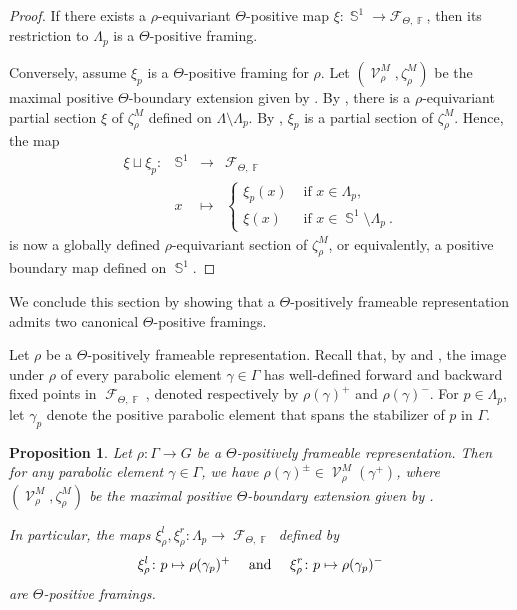\documentclass{amsart}
\theoremstyle{plain}
\newtheorem{proposition}{Proposition}[section]
\theoremstyle{definition}
\newcommand{\bdext}{{\Vc^M_\rho}}
\DeclareMathOperator{\Fc}{\mathcal{F}}
\DeclareMathOperator{\Vc}{\mathcal{V}}
\DeclareMathOperator{\Fb}{{\mathbb{F}}}
\DeclareMathOperator{\Sb}{\mathbb{S}}
\newcommand{\1}{\mathbf{1}}
\begin{document}
\begin{proof}
    If there exists a $\rho$-equivariant $\Theta$-positive map $\xi \colon \Sb^1 \to \mathcal F_{\Theta,\Fb}$, then its restriction to $\Lambda_p$ is a $\Theta$-positive framing.

    Conversely, assume $\xi_p$ is a $\Theta$-positive framing for $\rho$.
    Let $(\bdext,\zeta^M_\rho)$ be the maximal positive $\Theta$-boundary extension given by . By , there is a $\rho$-equivariant partial section $\xi$ of $\zeta^M_\rho$ defined on $\Lambda \setminus \Lambda_p$. By , $\xi_p$ is a partial section of $\zeta^M_\rho$. Hence, the map
    \[\begin{array}{cccc}
    \xi \sqcup \xi_p \colon & \Sb^1 & \to & \Fc_{\Theta,\Fb}\\
    &x & \mapsto  &
        \begin{cases*}
        \xi_p(x) &\textrm{ if $x\in \Lambda_p$},\\
        \xi(x) &\textrm{ if $x\in \Sb^1\setminus \Lambda_p$}~.
        \end{cases*}
    \end{array}
    \]
    is now a globally defined $\rho$-equivariant section of $\zeta^M_\rho$, or equivalently, a positive boundary map defined on $\Sb^1$.
\end{proof}

We conclude this section by showing that a $\Theta$-positively frameable representation admits two canonical $\Theta$-positive framings.

Let $\rho$ be a $\Theta$-positively frameable representation.
Recall that, by  and , the image under $\rho$ of every parabolic element $\gamma \in \Gamma$ has well-defined forward and backward fixed points in $\Fc_{\Theta,\Fb}$, denoted respectively by $\rho(\gamma)^+$ and $\rho(\gamma)^-$.
For $p \in \Lambda_p$, let $\gamma_p$ denote the positive parabolic element that spans the stabilizer of $p$ in $\Gamma$.

\begin{proposition}
\label{lem:PosFramedRepr}
   Let $\rho\colon \Gamma \to G$ be a $\Theta$-positively frameable representation. Then for any parabolic element $\gamma\in\Gamma$, we have $\rho(\gamma)^\pm\in\bdext(\gamma^+)$, where $(\bdext,\zeta^M_\rho)$ be the maximal positive $\Theta$-boundary extension given by . 
   
   In particular, the maps $\xi_\rho^l, \xi_\rho^r\colon \Lambda_p \to \Fc_{\Theta,\Fb}$ defined by
   \[\xi_\rho^l\colon p \mapsto \rho(\gamma_p)^+\quad \textnormal{ and } \quad\xi_\rho^r\colon p \mapsto \rho(\gamma_p)^-\]
   are $\Theta$-positive framings.
\end{proposition}
\end{document}
